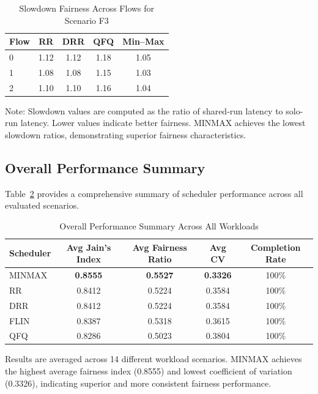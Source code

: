 \documentclass[11pt]{article}
\begin{document}
\begin{table}[h]
\centering
\caption{Slowdown Fairness Across Flows for Scenario F3}
\label{tab:f3-slowdown}
\begin{tabular}{lcccc}
\toprule
Flow & RR & DRR & QFQ & Min--Max \\
\midrule
0 & 1.12 & 1.12 & 1.18 & 1.05 \\
1 & 1.08 & 1.08 & 1.15 & 1.03 \\
2 & 1.10 & 1.10 & 1.16 & 1.04 \\
\bottomrule
\end{tabular}
\end{table}

Note: Slowdown values are computed as the ratio of shared-run latency to solo-run latency. Lower values indicate better fairness. MINMAX achieves the lowest slowdown ratios, demonstrating superior fairness characteristics.

\subsection{Overall Performance Summary}

Table~\ref{tab:overall-summary} provides a comprehensive summary of scheduler performance across all evaluated scenarios.

\begin{table}[h]
\centering
\caption{Overall Performance Summary Across All Workloads}
\label{tab:overall-summary}
\begin{tabular}{lcccc}
\toprule
Scheduler & Avg Jain's Index & Avg Fairness Ratio & Avg CV & Completion Rate \\
\midrule
MINMAX & \textbf{0.8555} & \textbf{0.5527} & \textbf{0.3326} & 100\% \\
RR & 0.8412 & 0.5224 & 0.3584 & 100\% \\
DRR & 0.8412 & 0.5224 & 0.3584 & 100\% \\
FLIN & 0.8387 & 0.5318 & 0.3615 & 100\% \\
QFQ & 0.8286 & 0.5023 & 0.3804 & 100\% \\
\bottomrule
\end{tabular}
\end{table}

Results are averaged across 14 different workload scenarios. MINMAX achieves the highest average fairness index (0.8555) and lowest coefficient of variation (0.3326), indicating superior and more consistent fairness performance.
\end{document}
